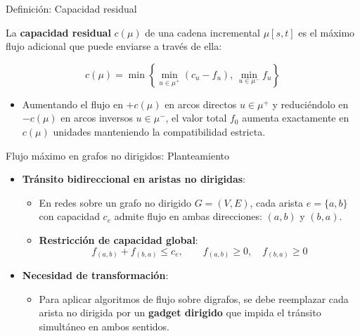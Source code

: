\documentclass[
  ignorenonframetext,
]{beamer}
\providecommand{\tightlist}{%
  \setlength{\itemsep}{0pt}\setlength{\parskip}{0pt}}
\begin{document}
\begin{frame}{Definición: Capacidad residual}
\label{definiciuxf3n-capacidad-residual}
\begin{tcolorbox}[enhanced jigsaw, opacityback=0, breakable, title=\textcolor{quarto-callout-note-color}{\faInfo}\hspace{0.5em}{Capacidad residual de una cadena}, colback=white, colbacktitle=quarto-callout-note-color!10!white, bottomrule=.15mm, opacitybacktitle=0.6, coltitle=black, bottomtitle=1mm, leftrule=.75mm, colframe=quarto-callout-note-color-frame, toptitle=1mm, titlerule=0mm, rightrule=.15mm, left=2mm, arc=.35mm, toprule=.15mm]

La \textbf{capacidad residual} \(c(\mu)\) de una cadena incremental
\(\mu[s, t]\) es el máximo flujo adicional que puede enviarse a través
de ella:

\[
c(\mu) = \min \left\{ \min_{u \in \mu^+} (c_u - f_u), \, \min_{u \in \mu^-} f_u \right\}
\]

\end{tcolorbox}

\begin{itemize}
\tightlist
\item
  Aumentando el flujo en \(+c(\mu)\) en arcos directos \(u \in \mu^+\) y
  reduciéndolo en \(-c(\mu)\) en arcos inversos \(u \in \mu^-\), el
  valor total \(f_0\) aumenta exactamente en \(c(\mu)\) unidades
  manteniendo la compatibilidad estricta.
\end{itemize}
\end{frame}

\begin{frame}{Flujo máximo en grafos no dirigidos: Planteamiento}
\label{flujo-muxe1ximo-en-grafos-no-dirigidos-planteamiento}
\begin{itemize}
\tightlist
\item
  \textbf{Tránsito bidireccional en aristas no dirigidas}:

  \begin{itemize}
  \tightlist
  \item
    En redes sobre un grafo no dirigido \(G = (V, E)\), cada arista
    \(e = \{a, b\}\) con capacidad \(c_e\) admite flujo en ambas
    direcciones: \((a, b)\) y \((b, a)\).
  \item
    \textbf{Restricción de capacidad global}:
    \[f_{(a,b)} + f_{(b,a)} \le c_e, \qquad f_{(a,b)} \ge 0, \quad f_{(b,a)} \ge 0\]
  \end{itemize}
\item
  \textbf{Necesidad de transformación}:

  \begin{itemize}
  \tightlist
  \item
    Para aplicar algoritmos de flujo sobre digrafos, se debe reemplazar
    cada arista no dirigida por un \textbf{gadget dirigido} que impida
    el tránsito simultáneo en ambos sentidos.
  \end{itemize}
\end{itemize}
\end{frame}
\end{document}
